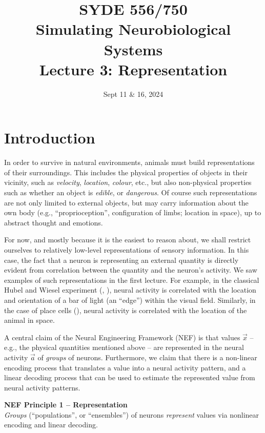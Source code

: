 \documentclass[10pt,letterpaper,oneside]{article}
\date{Sept 11 \& 16, 2024}
\title{SYDE 556/750 \\ Simulating Neurobiological Systems \\ Lecture 3: Representation}
\begin{document}

\section{Introduction}


In order to survive in natural environments, animals must build representations of their surroundings. This includes the physical properties of objects in their vicinity, such as \emph{velocity}, \emph{location}, \emph{colour}, etc., but also non-physical properties such as whether an object is \emph{edible}, or \emph{dangerous}. Of course such representations are not only limited to external objects, but may carry information about the own body (e.g., \enquote{proprioception}, configuration of limbs; location in space), up to abstract thought and emotions.

For now, and mostly because it is the easiest to reason about, we shall restrict ourselves to relatively low-level representations of sensory information. In this case, the fact that a neuron is representing an external quantity is directly evident from correlation between the quantity and the neuron's activity.  We saw examples of such representations in the first lecture. For example, in the classical Hubel and Wiesel experiment (, \cite{hubel1959receptive}), neural activity is correlated with the location and orientation of a bar of light (an \enquote{edge}) within the visual field. Similarly, in the case of place cells (), neural activity is correlated with the location of the animal in space.

A central claim of the Neural Engineering Framework (NEF) is that values $\vec x$ -- e.g., the physical quantities mentioned above -- are represented in the neural activity $\vec a$ of \emph{groups} of neurons. Furthermore, we claim that there is a non-linear encoding process that translates a value into a neural activity pattern, and a linear decoding process that can be used to estimate the represented value from neural activity patterns.

\begin{mdframed}
\textbf{NEF Principle 1 -- Representation}\\
\emph{Groups} (\enquote{populations}, or \enquote{ensembles}) of neurons \emph{represent} values via nonlinear encoding and linear decoding.
\end{mdframed}
\end{document}
